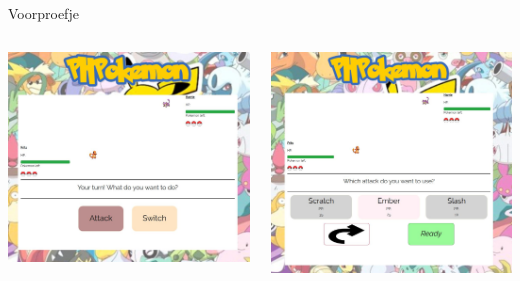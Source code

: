 \documentclass{beamer}
\begin{document}
\begin{frame}{Voorproefje}
	\begin{columns}
			\includegraphics[width=\linewidth]{Images/screenshot2.jpg}
		
			\includegraphics[width=\linewidth]{Images/screenshot3.jpg}

	\end{columns}
\end{frame}
\end{document}
